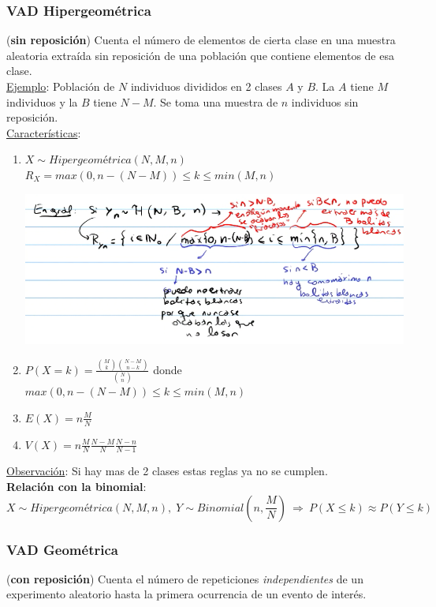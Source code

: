 \documentclass{article}
\newcommand{\Rightarrows}{\: \Rightarrow \:}            %
\newcommand{\comb}[2]{{{#1}\choose{#2}}}
\begin{document}
\subsubsection{VAD Hipergeométrica}
(\textbf{sin reposición}) Cuenta el número de elementos de cierta clase en una muestra aleatoria extraída sin reposición de una población que contiene elementos de esa clase. 
\\\underline{Ejemplo}: Población de $N$ individuos divididos en 2 clases $A$ y $B$. La $A$ tiene $M$ individuos y la $B$ tiene $N-M$. Se toma una muestra de $n$ individuos sin reposición.
\\\underline{Características}:
\begin{enumerate}
    \item $X \sim Hipergeométrica(N,M,n)$
        \subitem $R_X = max(0, n - (N - M)) \leq k \leq min(M,n)$
    \begin{center}
        \includegraphics[width=.60\textwidth]{Images/VADHipRx.png}
    \end{center} 
    \item $P(X=k) = \frac{\comb{M}{k} \comb{N-M}{n-k}}{\comb{N}{n}}$ donde $max(0, n - (N - M)) \leq k \leq min(M,n)$
    \item $E(X) = n \frac{M}{N}$
    \item $V(X) = n \frac{M}{N} \frac{N-M}{N} \frac{N-n}{N-1}$
\end{enumerate}
\underline{Observación}: Si hay mas de 2 clases estas reglas ya no se cumplen.
\\\textbf{Relación con la binomial}: 
\begin{equation*}
    X \sim Hipergeométrica(N, M, n), \; Y \sim Binomial(n ,\frac{M}{N}) \Rightarrows P(X \leq k) \approx P(Y \leq k)
\end{equation*}

\subsubsection{VAD Geométrica}
(\textbf{con reposición}) Cuenta el número de repeticiones \emph{independientes} de un experimento aleatorio hasta la primera ocurrencia de un evento de interés. 
\end{document}
